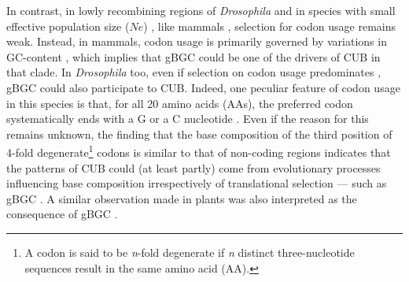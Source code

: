 In contrast, in lowly recombining regions of \textit{Drosophila} \citep{kliman1993reduced} and in species with small effective population size ($Ne$) \citep{subramanian2008nearly,galtier2018codon}, like mammals \citep{urrutia2003signature,comeron2004selective,lavner2005codon}, selection for codon usage remains weak.
Instead, in mammals, codon usage is primarily governed by variations in GC-content \citep[but see \citealp{doherty2013translational}]{semon2006no,rudolph2016codondriven,pouyet2017recombination}, which implies that gBGC could be one of the drivers of CUB in that clade.
In \textit{Drosophila} too, even if selection on codon usage predominates \citep{zeng2009estimating,zeng2010studying,zeng2010simple}, gBGC could also participate to CUB\@.
Indeed, one peculiar feature of codon usage in this species is that, for all 20 amino acids (AAs), the preferred codon systematically ends with a G or a C nucleotide \citep[reviewed in][]{duret2009biased}.
Even if the reason for this remains unknown, the finding that the base composition of the third position of 4-fold degenerate\footnote{A codon is said to be \textit{n}-fold degenerate if \textit{n} distinct three-nucleotide sequences result in the same amino acid (AA).} codons is similar to that of non-coding regions \citep{clay2011gc3} indicates that the patterns of CUB could (at least partly) come from evolutionary processes influencing base composition irrespectively of translational selection — such as gBGC \citep[but see \citealp{jackson2017variation}]{duret2002evolution,galtier2006gcbiased,lynch2007origins}. 
A similar observation made in plants was also interpreted as the consequence of gBGC \citep{clement2017evolutionary}.





